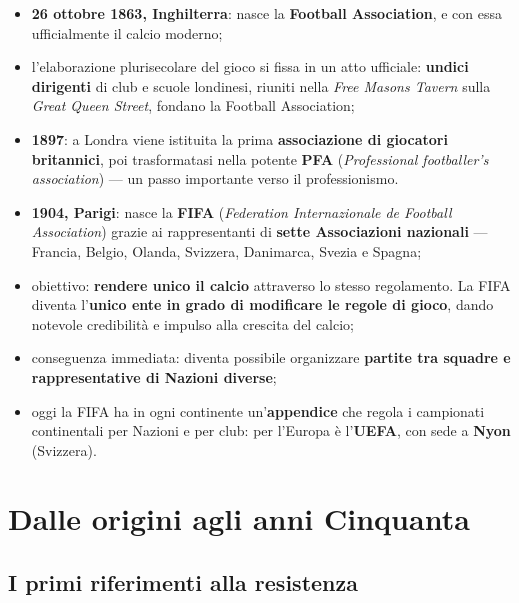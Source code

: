 \begin{itemize}
  \item \textbf{26 ottobre 1863, Inghilterra}: nasce la \textbf{Football Association}, e con essa
    ufficialmente il calcio moderno;
  \item l'elaborazione plurisecolare del gioco si fissa in un atto ufficiale: \textbf{undici
    dirigenti} di club e scuole londinesi, riuniti nella \textit{Free Masons Tavern} sulla
    \textit{Great Queen Street}, fondano la Football Association;
  \item \textbf{1897}: a Londra viene istituita la prima \textbf{associazione di giocatori
    britannici}, poi trasformatasi nella potente \textbf{PFA} (\textit{Professional footballer's
    association}) --- un passo importante verso il professionismo.
\end{itemize}

\begin{itemize}
  \item \textbf{1904, Parigi}: nasce la \textbf{FIFA} (\textit{Federation Internazionale de Football
    Association}) grazie ai rappresentanti di \textbf{sette Associazioni nazionali} --- Francia,
    Belgio, Olanda, Svizzera, Danimarca, Svezia e Spagna;
  \item obiettivo: \textbf{rendere unico il calcio} attraverso lo stesso regolamento. La FIFA
    diventa l'\textbf{unico ente in grado di modificare le regole di gioco}, dando notevole
    credibilità e impulso alla crescita del calcio;
  \item conseguenza immediata: diventa possibile organizzare \textbf{partite tra squadre e
    rappresentative di Nazioni diverse};
  \item oggi la FIFA ha in ogni continente un'\textbf{appendice} che regola i campionati
    continentali per Nazioni e per club: per l'Europa è l'\textbf{UEFA}, con sede a \textbf{Nyon}
    (Svizzera).
\end{itemize}

\section{Dalle origini agli anni Cinquanta}

\subsection{I primi riferimenti alla resistenza}

